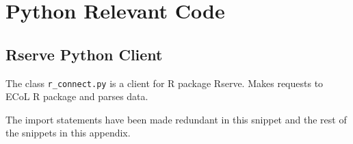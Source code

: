 \chapter{Python Relevant Code}
\label{chp:pythoncode}

\section{Rserve Python Client} \label{sec:rconnect}

The class \lstinline{r_connect.py} is a client for R package Rserve. Makes 
requests to ECoL R package and parses data. 

The import statements have been made redundant in this snippet and the rest of 
the snippets in this appendix.

